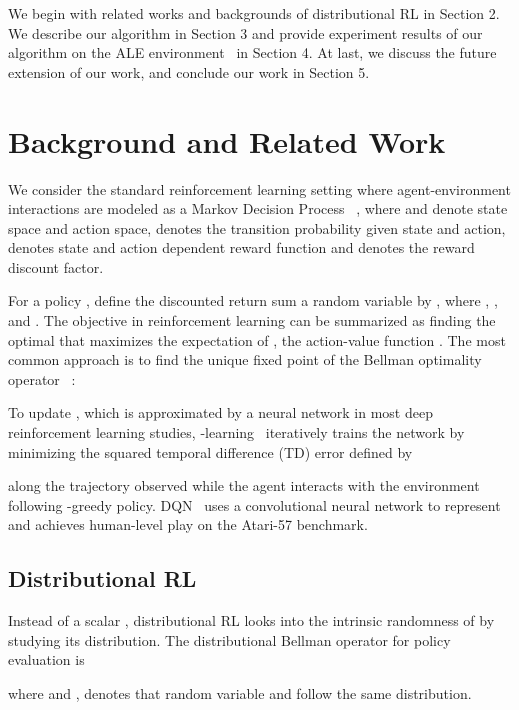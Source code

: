\documentclass{article}
\begin{document}
We begin with related works and backgrounds of distributional RL in Section 2. We describe our algorithm in Section 3 and provide experiment results of our algorithm on the ALE environment~\citep{bellemare2013arcade} in Section 4. At last, we discuss the future extension of our work, and conclude our work in Section 5.


\section{Background and Related Work}
We consider the standard reinforcement learning setting where agent-environment interactions are modeled as a Markov Decision Process ~\citep{Puterman:1994:MDP:528623}, where  and  denote state space and action space,  denotes the transition probability given state and action,  denotes state and action dependent reward function and  denotes the reward discount factor.

For a policy , define the discounted return sum a random variable by  , where , ,  and . The objective in reinforcement learning can be summarized as finding the optimal  that maximizes the expectation of , the action-value function . The most common approach is to find the unique fixed point of the Bellman optimality operator ~\citep{Bellman:1957}: 


To update , which is approximated by a neural network in most deep reinforcement learning studies, -learning~\citep{watkins1989learning} iteratively trains the network by minimizing the squared temporal difference (TD) error defined by

along the trajectory observed while the agent interacts with the environment following -greedy policy.
DQN~\citep{mnih2015humanlevel} uses a convolutional neural network to represent  and achieves human-level play on the Atari-57 benchmark.

\subsection{Distributional RL}
Instead of a scalar , distributional RL looks into the intrinsic randomness of  by studying its distribution. The distributional Bellman operator for policy evaluation is 

where  
and ,   denotes that random variable  and  follow the same distribution.
\end{document}
